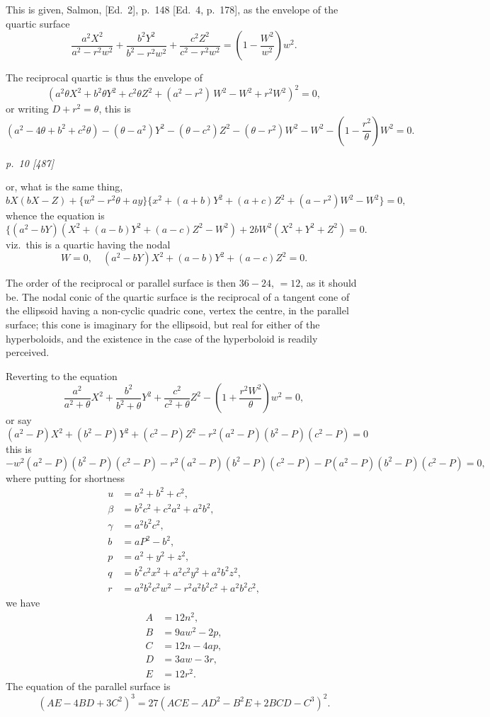 \documentclass[11pt,a4paper]{article}
\theoremstyle{plain}
\theoremstyle{definition}
\begin{document}
This is given, Salmon, [Ed.\ 2], p.~148 [Ed.\ 4, p.~178], as the envelope of the
quartic surface
\[
\frac{a^2 X^2}{a^2 - r^2 w^2} + \frac{b^2 Y^2}{b^2 - r^2 w^2} + \frac{c^2 Z^2}{c^2 - r^2 w^2} = \left(1 - \frac{W^2}{w^2}\right) w^2.
\]

The reciprocal quartic is thus the envelope of
\[
(a^2 \theta X^2 + b^2 \theta Y^2 + c^2 \theta Z^2 + (a^2 - r^2)\, W^2 - W^2 + r^2 W^2)^2 = 0,
\]
or writing $D + r^2 = \theta$, this is
\[
(a^2 - 4\theta + b^2 + c^2 \theta) - (\theta - a^2)Y^2 - (\theta - c^2)Z^2 - (\theta - r^2)W^2 - W^2 - \left(1 - \frac{r^2}{\theta}\right)W^2 = 0.
\]

\clearpage

\bigskip
\textit{p.~10 [487]}
\smallskip

or, what is the same thing,
\[
b X(b X - Z) + \{w^2 - r^2\theta + ay\}\{x^2 + (a + b)Y^2 + (a + c) Z^2 + (a - r^2) W^2 - W^2\} = 0,
\]
whence the equation is
\[
\{(a^2 - bY)(X^2 + (a - b)Y^2 + (a - c)Z^2 - W^2) + 2bW^2 (X^2 + Y^2 + Z^2) = 0.
\]
viz.\ this is a quartic having the nodal
\[
W = 0, \quad (a^2 - bY)X^2 + (a - b)Y^2 + (a - c)Z^2 = 0.
\]

The order of the reciprocal or parallel surface is then $36 - 24$, $= 12$, as it should be.
The nodal conic of the quartic surface is the reciprocal of a tangent cone of the ellipsoid having a non-cyclic quadric cone, vertex the centre, in the parallel surface; this cone is imaginary for the ellipsoid, but real for either of the hyperboloids, and the existence in the case of the hyperboloid is readily perceived.

Reverting to the equation
\[
\frac{a^2}{a^2 + \theta}X^2 + \frac{b^2}{b^2 + \theta}Y^2 + \frac{c^2}{c^2 + \theta}Z^2 - \left(1 + \frac{r^2 W^2}{\theta}\right)w^2 = 0,
\]
or say
\[
(a^2 - P)X^2 + (b^2 - P)Y^2 + (c^2 - P)Z^2 - r^2(a^2 - P)(b^2 - P)(c^2 - P) = 0
\]
this is
\[
-w^2(a^2 - P)(b^2 - P)(c^2 - P) - r^2(a^2 - P)(b^2 - P)(c^2 - P) - P(a^2 - P)(b^2 - P)(c^2 - P) = 0,
\]
where putting for shortness
\begin{align*}
u &= a^2 + b^2 + c^2, \\
\beta &= b^2c^2 + c^2a^2 + a^2b^2, \\
\gamma &= a^2b^2c^2, \\
b &= aP^2 - b^2,\\
p &= a^2 + y^2 + z^2,\\
q &= b^2c^2x^2 + a^2c^2y^2 + a^2b^2z^2, \\
r &= a^2b^2c^2w^2 - r^2 a^2 b^2 c^2 + a^2 b^2 c^2 ,
\end{align*}
we have
\begin{align*}
A &= 12n^2, \\
B &= 9aw^2 - 2p, \\
C &= 12n - 4ap, \\
D &= 3aw - 3r, \\
E &= 12r^2.
\end{align*}
The equation of the parallel surface is
\[
(A E - 4 B D + 3 C^2)^3 = 27(A C E - A D^2 - B^2 E + 2 B C D - C^3)^2.
\]
\end{document}
